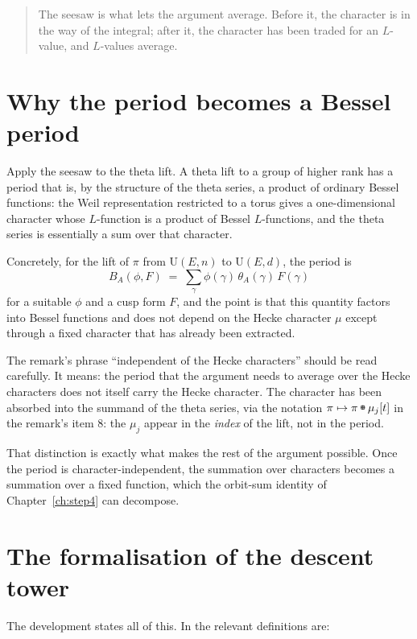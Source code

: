 \begin{quote}
The seesaw is what lets the argument average. Before it, the character is in
the way of the integral; after it, the character has been traded for an
$L$-value, and $L$-values average.
\end{quote}

\section{Why the period becomes a Bessel period}Apply the seesaw to the theta lift. A theta lift to a group of higher rank
has a period that is, by the structure of the theta series, a product of
ordinary Bessel functions: the Weil representation restricted to a torus gives
a one-dimensional character whose $L$-function is a product of Bessel
$L$-functions, and the theta series is essentially a sum over that character.

Concretely, for the lift of $\pi$ from $\mathrm{U}(E,n)$ to $\mathrm{U}(E,d)$,
the period is
\begin{equation}
B_A(\phi, F) \;=\; \sum_{\gamma} \phi(\gamma)\,\theta_A(\gamma)\,F(\gamma)
\label{eq:bessel}
\end{equation}
for a suitable $\phi$ and a cusp form $F$, and the point is that this
quantity factors into Bessel functions and does not depend on the Hecke
character $\mu$ except through a fixed character that has already been
extracted.

The remark's phrase ``independent of the Hecke characters'' should be read
carefully. It means: the period that the argument needs to average over the
Hecke characters does not itself carry the Hecke character. The character has
been absorbed into the summand of the theta series, via the notation
$\pi \mapsto \pi \tboxplus \mu_j[t]$ in the remark's item 8: the $\mu_j$ appear
in the \emph{index} of the lift, not in the period.

That distinction is exactly what makes the rest of the argument possible. Once
the period is character-independent, the summation over characters becomes a
summation over a fixed function, which the orbit-sum identity of
Chapter~\ref{ch:step4} can decompose.

\section{The formalisation of the descent tower}The development states all of this. In
the relevant definitions are:

